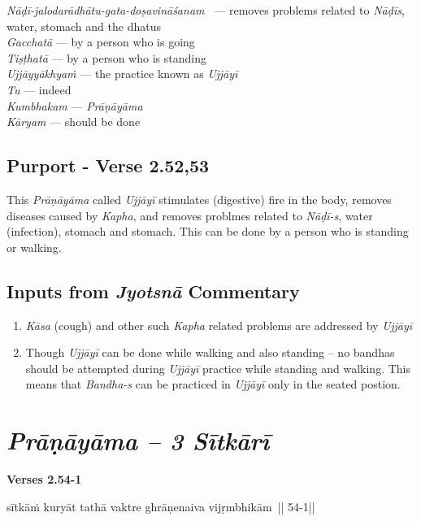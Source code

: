 \begin{multicols}{2}
\textit{Nāḍī-jalodarādhātu-gata-doṣavi\-nāśanam  }--- removes problems related to \textit{Nāḍīs}, water, stomach and the dhatus\\
\textit{Gacchatā} --- by a person who is going \\
\textit{Tiṣṭhatā} --- by a person who is standing \\
\textit{Ujjāyyākhyaṁ} --- the practice known as \textit{Ujjāyī}\\
\textit{Tu} --- indeed \\
\textit{Kumbhakam} --- \textit{Prāṇāyāma} \\
\textit{Kāryam} --- should be done
\end{multicols}

\subsection*{Purport - Verse 2.52,53}


This \textit{Prāṇāyāma} called \textit{Ujjāyī} stimulates (digestive) fire in the body, removes diseases caused by \textit{Kapha}, and removes problmes related to \textit{Nāḍī-s}, water (infection), stomach and stomach. This can be done by a person who is standing or walking.

\subsection*{Inputs from \textit{Jyotsnā} Commentary}


\begin{enumerate}
\item \textit{Kāsa} (cough) and other such \textit{Kapha} related problems are addressed by \textit{Ujjāyī} 
\item Though \textit{Ujjāyī} can be done while walking and also standing – no bandhas should be attempted during \textit{Ujjāyī} practice while standing and walking. This means that \textit{Bandha-s} can be practiced in \textit{Ujjāyī} only in the seated postion. 
\end{enumerate}
\newpage

\section*{\textit{Prāṇāyāma -- 3 Sītkārī}}

\noindent \textbf{Verses 2.54-1 }

\begin{center}
sītkāṁ kuryāt tathā vaktre ghrāṇenaiva vijṛmbhikām || 54-1||
\end{center}

